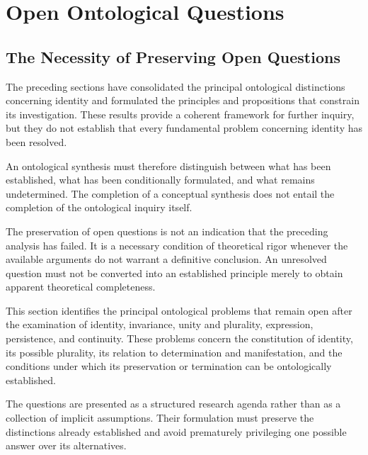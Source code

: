 
\section{Open Ontological Questions}
\label{sec:open-ontological-questions}


\subsection{The Necessity of Preserving Open Questions}

The preceding sections have consolidated the principal
ontological distinctions concerning identity and formulated
the principles and propositions that constrain its
investigation. These results provide a coherent framework
for further inquiry, but they do not establish that every
fundamental problem concerning identity has been resolved.

An ontological synthesis must therefore distinguish
between what has been established, what has been
conditionally formulated, and what remains undetermined.
The completion of a conceptual synthesis does not entail
the completion of the ontological inquiry itself.

The preservation of open questions is not an indication
that the preceding analysis has failed. It is a necessary
condition of theoretical rigor whenever the available
arguments do not warrant a definitive conclusion. An
unresolved question must not be converted into an
established principle merely to obtain apparent
theoretical completeness.

This section identifies the principal ontological problems
that remain open after the examination of identity,
invariance, unity and plurality, expression, persistence,
and continuity. These problems concern the constitution
of identity, its possible plurality, its relation to
determination and manifestation, and the conditions
under which its preservation or termination can be
ontologically established.

The questions are presented as a structured research
agenda rather than as a collection of implicit assumptions.
Their formulation must preserve the distinctions already
established and avoid prematurely privileging one
possible answer over its alternatives.

